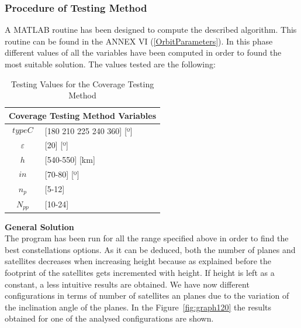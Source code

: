 \subsubsection{Procedure of Testing Method}

A MATLAB routine has been designed to compute the described algorithm. This routine can be found in the ANNEX VI (\ref{OrbitParameters}). In this phase different values of all the variables have been computed in order to found the most suitable solution. The values tested are the following:

\begin{table}[H]
\centering
\begin{tabular}{|c|l|}
\hline
\multicolumn{2}{|c|}{Coverage Testing Method Variables}     \\ \hline
$$typeC$$          & {[}180 210 225 240 360{]} {[}º{]} 			 \\ \hline
$\varepsilon$      & {[}20{]} {[}º{]}                         \\ \hline
$$h$$              & {[}540-550{]} {[}km{]}                   \\ \hline
$$in$$             & {[}70-80{]} {[}º{]}                 \\ \hline
$n_{p}$            & {[}5-12{]}                        \\ \hline
$N_{pp}$           & {[}10-24{]}                    \\ \hline
\end{tabular}
\caption{Testing Values for the Coverage Testing Method}
\label{t:varRange}
\end{table}  

\textbf{General Solution}\\

The program has been run for all the range specified above in order to find the best constellations options. As it can be deduced, both the number of planes and satellites decreases when increasing height because as explained before the footprint of the satellites gets incremented with height.
If height is left as a constant, a less intuitive results are obtained. We have now different configurations in terms of number of satellites an planes due to the variation of the inclination angle of the planes.
In the Figure~\ref{fig:graph120} the results obtained for one of the analysed configurations are shown. \\

